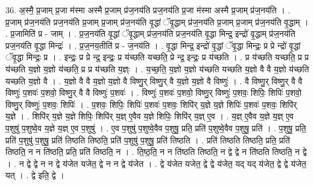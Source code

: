 \documentclass[17pt]{extarticle}
\begin{document}
36. अ॒स्मै॒ प्र॒जाम् प्र॒जा म॑स्मा अस्मै प्र॒जाम् प्र॑ज॒नय॑ति प्रज॒नय॑ति प्र॒जा म॑स्मा अस्मै प्र॒जाम् प्र॑ज॒नय॑ति । . प्र॒जाम् प्र॑ज॒नय॑ति प्रज॒नय॑ति प्र॒जाम् प्र॒जाम् प्र॑ज॒नय॑ति वृ॒द्धां ॅवृ॒द्धाम् प्र॑ज॒नय॑ति प्र॒जाम् प्र॒जाम् प्र॑ज॒नय॑ति वृ॒द्धाम् । . प्र॒जामिति॑ प्र - जाम् । . प्र॒ज॒नय॑ति वृ॒द्धां ॅवृ॒द्धाम् प्र॑ज॒नय॑ति प्रज॒नय॑ति वृ॒द्धा मिन्द्र॒ इन्द्रो॑ वृ॒द्धाम् प्र॑ज॒नय॑ति प्रज॒नय॑ति वृ॒द्धा मिन्द्रः॑ । . प्र॒ज॒नय॒तीति॑ प्र - ज॒नय॑ति । . वृ॒द्धा मिन्द्र॒ इन्द्रो॑ वृ॒द्धां ॅवृ॒द्धा मिन्द्रः॒ प्र प्रे न्द्रो॑ वृ॒द्धां ॅवृ॒द्धा मिन्द्रः॒ प्र । . इन्द्रः॒ प्र प्रे न्द्र॒ इन्द्रः॒ प्र य॑च्छति यच्छति॒ प्रे न्द्र॒ इन्द्रः॒ प्र य॑च्छति । . प्र य॑च्छति यच्छति॒ प्र प्र य॑च्छति य॒ज्ञो य॒ज्ञो य॑च्छति॒ प्र प्र य॑च्छति य॒ज्ञ्ः । . य॒च्छ॒ति॒ य॒ज्ञो य॒ज्ञो य॑च्छति यच्छति य॒ज्ञो वै वै य॒ज्ञो य॑च्छति यच्छति य॒ज्ञो वै । . य॒ज्ञो वै वै य॒ज्ञो य॒ज्ञो वै विष्णु॒र् विष्णु॒र् वै य॒ज्ञो य॒ज्ञो वै विष्णुः॑ । . वै विष्णु॒र् विष्णु॒र् वै वै विष्णुः॑ प॒शवः॑ प॒शवो॒ विष्णु॒र् वै वै विष्णुः॑ प॒शवः॑ । . विष्णुः॑ प॒शवः॑ प॒शवो॒ विष्णु॒र् विष्णुः॑ प॒शवः॒ शिपिः॒ शिपिः॑ प॒शवो॒ विष्णु॒र् विष्णुः॑ प॒शवः॒ शिपिः॑ । . प॒शवः॒ शिपिः॒ शिपिः॑ प॒शवः॑ प॒शवः॒ शिपि॑र् य॒ज्ञे य॒ज्ञे शिपिः॑ प॒शवः॑ प॒शवः॒ शिपि॑र् य॒ज्ञे । . शिपि॑र् य॒ज्ञे य॒ज्ञे शिपिः॒ शिपि॑र् य॒ज्ञ् ए॒वैव य॒ज्ञे शिपिः॒ शिपि॑र् य॒ज्ञ् ए॒व । . य॒ज्ञ् ए॒वैव य॒ज्ञे य॒ज्ञ् ए॒व प॒शुषु॑ प॒शुष्वे॒व य॒ज्ञे य॒ज्ञ् ए॒व प॒शुषु॑ । . ए॒व प॒शुषु॑ प॒शुष्वे॒वैव प॒शुषु॒ प्रति॒ प्रति॑ प॒शुष्वे॒वैव प॒शुषु॒ प्रति॑ । . प॒शुषु॒ प्रति॒ प्रति॑ प॒शुषु॑ प॒शुषु॒ प्रति॑ तिष्ठति तिष्ठति॒ प्रति॑ प॒शुषु॑ प॒शुषु॒ प्रति॑ तिष्ठति । . प्रति॑ तिष्ठति तिष्ठति॒ प्रति॒ प्रति॑ तिष्ठति॒ न न ति॑ष्ठति॒ प्रति॒ प्रति॑ तिष्ठति॒ न । . ति॒ष्ठ॒ति॒ न न ति॑ष्ठति तिष्ठति॒ न द्वे द्वे न ति॑ष्ठति तिष्ठति॒ न द्वे । . न द्वे द्वे न न द्वे य॑जेत यजेत॒ द्वे न न द्वे य॑जेत । . द्वे य॑जेत यजेत॒ द्वे द्वे य॑जेत॒ यद् यद् य॑जेत॒ द्वे द्वे य॑जेत॒ यत् । . द्वे इति॒ द्वे । \newline
\pagebreak
{}
\end{document}
